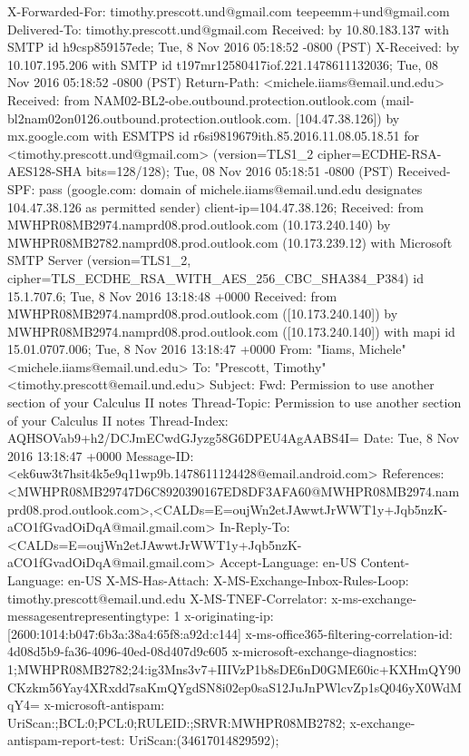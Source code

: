 \begin{itemize}
\begin{itemize}
X-Forwarded-For: timothy.prescott.und@gmail.com teepeemm+und@gmail.com
Delivered-To: timothy.prescott.und@gmail.com
Received: by 10.80.183.137 with SMTP id h9csp859157ede;
        Tue, 8 Nov 2016 05:18:52 -0800 (PST)
X-Received: by 10.107.195.206 with SMTP id t197mr12580417iof.221.1478611132036;
        Tue, 08 Nov 2016 05:18:52 -0800 (PST)
Return-Path: <michele.iiams@email.und.edu>
Received: from NAM02-BL2-obe.outbound.protection.outlook.com (mail-bl2nam02on0126.outbound.protection.outlook.com. [104.47.38.126])
        by mx.google.com with ESMTPS id r6si9819679ith.85.2016.11.08.05.18.51
        for <timothy.prescott.und@gmail.com>
        (version=TLS1_2 cipher=ECDHE-RSA-AES128-SHA bits=128/128);
        Tue, 08 Nov 2016 05:18:51 -0800 (PST)
Received-SPF: pass (google.com: domain of michele.iiams@email.und.edu designates 104.47.38.126 as permitted sender) client-ip=104.47.38.126;
Received: from MWHPR08MB2974.namprd08.prod.outlook.com (10.173.240.140) by MWHPR08MB2782.namprd08.prod.outlook.com (10.173.239.12) with Microsoft SMTP Server (version=TLS1_2, cipher=TLS_ECDHE_RSA_WITH_AES_256_CBC_SHA384_P384) id 15.1.707.6; Tue, 8 Nov 2016 13:18:48 +0000
Received: from MWHPR08MB2974.namprd08.prod.outlook.com ([10.173.240.140]) by MWHPR08MB2974.namprd08.prod.outlook.com ([10.173.240.140]) with mapi id 15.01.0707.006; Tue, 8 Nov 2016 13:18:47 +0000
From: "Iiams, Michele" <michele.iiams@email.und.edu>
To: "Prescott, Timothy" <timothy.prescott@email.und.edu>
Subject: Fwd: Permission to use another section of your Calculus II notes
Thread-Topic: Permission to use another section of your Calculus II notes
Thread-Index: AQHSOVab9+h2/DCJmECwdGJyzg58G6DPEU4AgAABS4I=
Date: Tue, 8 Nov 2016 13:18:47 +0000
Message-ID: <ek6uw3t7hsit4k5e9q11wp9b.1478611124428@email.android.com>
References: <MWHPR08MB29747D6C8920390167ED8DF3AFA60@MWHPR08MB2974.namprd08.prod.outlook.com>,<CALDs=E=oujWn2etJAwwtJrWWT1y+Jqb5nzK-aCO1fGvadOiDqA@mail.gmail.com>
In-Reply-To: <CALDs=E=oujWn2etJAwwtJrWWT1y+Jqb5nzK-aCO1fGvadOiDqA@mail.gmail.com>
Accept-Language: en-US
Content-Language: en-US
X-MS-Has-Attach: 
X-MS-Exchange-Inbox-Rules-Loop: timothy.prescott@email.und.edu
X-MS-TNEF-Correlator: 
x-ms-exchange-messagesentrepresentingtype: 1
x-originating-ip: [2600:1014:b047:6b3a:38a4:65f8:a92d:c144]
x-ms-office365-filtering-correlation-id: 4d08d5b9-fa36-4096-40ed-08d407d9c605
x-microsoft-exchange-diagnostics: 1;MWHPR08MB2782;24:ig3Mns3v7+IIIVzP1b8sDE6nD0GME60ic+KXHmQY90CKzkm56Yay4XRxdd7saKmQYgdSN8i02ep0saS12JuJnPWlcvZp1sQ046yX0WdMqY4=
x-microsoft-antispam: UriScan:;BCL:0;PCL:0;RULEID:;SRVR:MWHPR08MB2782;
x-exchange-antispam-report-test: UriScan:(34617014829592);

\end{itemize}
\end{itemize}
